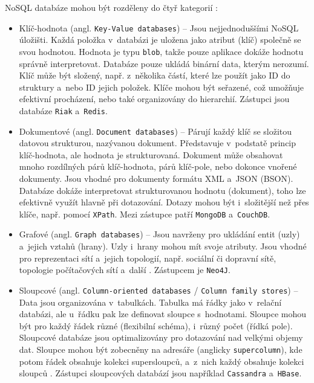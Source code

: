\vspace{0.5cm}
\noindent NoSQL databáze mohou být rozděleny do čtyř kategorií \cite{noSqlOverview}:
\begin{itemize}
    \item Klíč-hodnota (angl. \texttt{Key-Value databases}) -- Jsou nejjednoduššími NoSQL úložišti. Každá položka v~databázi je uložena jako atribut (klíč) společně se svou hodnotou. Hodnota je typu \texttt{blob}, takže pouze aplikace dokáže hodnotu správně interpretovat. Databáze pouze ukládá binární data, kterým nerozumí. Klíč může být složený, např. z~několika částí, které lze použít jako ID do struktury a~nebo ID jejich položek. Klíče mohou být seřazené, což umožňuje efektivní procházení, nebo také organizovány do hierarchií. Zástupci jsou databáze \texttt{Riak} a~\texttt{Redis}.
    
    \item Dokumentové (angl. \texttt{Document databases}) -- Párují každý klíč se složitou datovou strukturou, nazývanou dokument. Představuje v~podstatě princip klíč-hodnota, ale hodnota je strukturovaná. Dokument může obsahovat mnoho rozdílných párů klíč-hodnota, párů klíč-pole, nebo dokonce vnořené dokumenty. Jsou vhodné pro dokumenty formátu XML a~JSON (BSON).
    Databáze dokáže interpretovat strukturovanou hodnotu (dokument), toho lze efektivně využít hlavně při dotazování. Dotazy mohou být i~složitější než přes klíče, např. pomocí \texttt{XPath}. Mezi zástupce patří \texttt{MongoDB} a~\texttt{CouchDB}.
    
    \item Grafové (angl. \texttt{Graph databases}) -- Jsou navrženy pro ukládání entit (uzly) a~jejich vztahů (hrany). Uzly i~hrany mohou mít svoje atributy. Jsou vhodné pro reprezentaci sítí a~jejich topologií, např. sociální či dopravní sítě, topologie počítačových sítí a~další \cite{noSqlPdb}.
    Zástupcem je \texttt{Neo4J}.
    
    \item Sloupcové (angl. \texttt{Column-oriented databases} / \texttt{Column family stores}) -- Data jsou organizována v~tabulkách. Tabulka má řádky jako v~relační databázi, ale u~řádku pak lze definovat sloupce s~hodnotami. Sloupce mohou být pro každý řádek různé (flexibilní schéma), i~různý počet (řídká pole). Sloupcové databáze jsou optimalizovány pro dotazování nad velkými objemy dat. Sloupce mohou být zobecněny na adresáře (anglicky \texttt{supercolumn}), kde potom řádek obsahuje kolekci supersloupců, a~z~nich každý obsahuje kolekci sloupců \cite{noSqlPdb}. Zástupci sloupcových databází jsou například \texttt{Cassandra} a~\texttt{HBase}.
\end{itemize}

